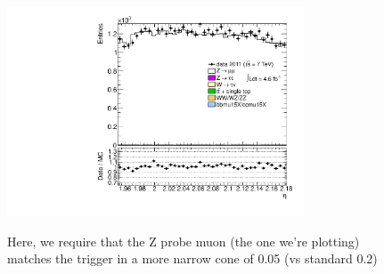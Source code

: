 {\includegraphics[width=0.66\textwidth]{dates/20130306/figures/both/Ztprobe_10_A_stack_lN_eta_ALL.pdf} 
\cole
}

 {
Here, we require that the Z probe muon (the one we're plotting) \\
matches the trigger in a more narrow cone of 0.05 (vs standard 0.2)
}
